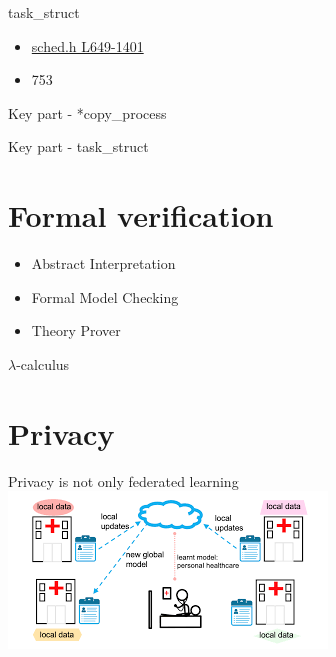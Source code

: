 \documentclass{beamer}
\begin{document}
\begin{CJK*}{UTF8}{bsmi}
\begin{frame}
        task\_struct
        \begin{itemize}
            \item \href{https://github.com/torvalds/linux/blob/master/include/linux/sched.h\#L649-L1401}{sched.h L649-1401}
            \item 753
        \end{itemize}
    \end{frame}

    \begin{frame}{Key part - *copy\_process}

    \end{frame}

    \begin{frame}{Key part - task\_struct}

    \end{frame}


    \section{Formal verification}
    \begin{frame}
        \begin{itemize}
            \item Abstract Interpretation
            \item Formal Model Checking
            \item Theory Prover
        \end{itemize}
    \end{frame}

    \begin{frame}{$\lambda$-calculus}

    \end{frame}

    \section{Privacy}
    \begin{frame}{Privacy is not only federated learning}
        \includegraphics[width=\textwidth]{fl.png}
    \end{frame}

    \begin{frame}{}

    \end{frame}
\end{CJK*}
\end{document}
